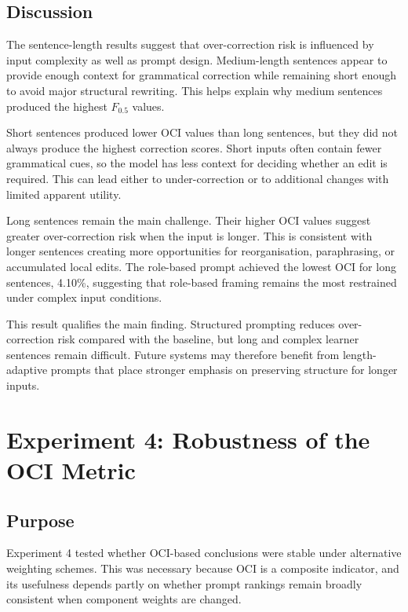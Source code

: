 \subsection{Discussion}

The sentence-length results suggest that over-correction risk is influenced by input complexity as well as prompt design. Medium-length sentences appear to provide enough context for grammatical correction while remaining short enough to avoid major structural rewriting. This helps explain why medium sentences produced the highest $F_{0.5}$ values.

Short sentences produced lower OCI values than long sentences, but they did not always produce the highest correction scores. Short inputs often contain fewer grammatical cues, so the model has less context for deciding whether an edit is required. This can lead either to under-correction or to additional changes with limited apparent utility.

Long sentences remain the main challenge. Their higher OCI values suggest greater over-correction risk when the input is longer. This is consistent with longer sentences creating more opportunities for reorganisation, paraphrasing, or accumulated local edits. The role-based prompt achieved the lowest OCI for long sentences, 4.10\%, suggesting that role-based framing remains the most restrained under complex input conditions.

This result qualifies the main finding. Structured prompting reduces over-correction risk compared with the baseline, but long and complex learner sentences remain difficult. Future systems may therefore benefit from length-adaptive prompts that place stronger emphasis on preserving structure for longer inputs.

\section{Experiment 4: Robustness of the OCI Metric}

\subsection{Purpose}

Experiment 4 tested whether OCI-based conclusions were stable under alternative weighting schemes. This was necessary because OCI is a composite indicator, and its usefulness depends partly on whether prompt rankings remain broadly consistent when component weights are changed.

